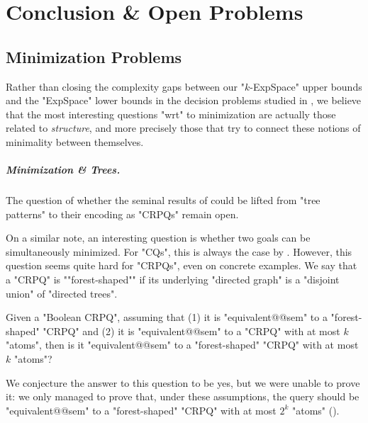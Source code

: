 \chapter[Conclusion \&~Open Problems]{Conclusion \& Open Problems}
\label{ch:conclu-database}
\renewcommand\thefigure{\thechapter.\arabic{figure}}

\section{Minimization Problems}

Rather than closing the complexity gaps between our "$k$-ExpSpace" upper bounds
and the "ExpSpace" lower bounds in the decision problems
studied in ,
we believe that the most interesting questions "wrt" to minimization
are actually those related to \emph{structure}, and more precisely those that try to
connect these notions of minimality between themselves.

\conjAtomVariableMinimal*

\paragraph*{Minimization \& Trees.}
The question of whether the seminal results of \cite{CzerwinskiMartensNiewerthParys2018Minimization} could be lifted from "tree patterns"
to their encoding as "CRPQs" remain open.
\conjTreePatternsAsCRPQs*

On a similar note, an interesting question is whether two goals can be simultaneously minimized.
For "CQs", this is always the case by . However, this question
seems quite hard for "CRPQs", even on concrete examples.
We say that a "CRPQ" is ""forest-shaped"" if its underlying "directed graph"
is a "disjoint union" of "directed trees".
\begin{question}
	Given a "Boolean CRPQ", assuming that (1) it is "equivalent@@sem" to
	a "forest-shaped" "CRPQ" and (2) it is "equivalent@@sem" to a "CRPQ"
  with at most $k$ "atoms", then is it "equivalent@@sem" to a 
  "forest-shaped" "CRPQ" with at most $k$ "atoms"?
\end{question}
We conjecture the answer to this question to be yes, but we were unable to prove it:
we only managed to prove that, under these assumptions, the query
should be "equivalent@@sem" to a "forest-shaped" "CRPQ" with at most $2^k$ "atoms"
().


